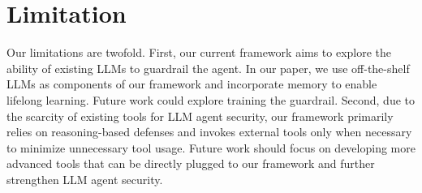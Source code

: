\section*{Limitation}



Our limitations are twofold. First, our current framework aims to explore the ability of existing LLMs to guardrail the agent. In our paper, we use off-the-shelf LLMs as components of our framework and incorporate memory to enable lifelong learning. Future work could explore training the guardrail. Second, due to the scarcity of existing tools for LLM agent security, our framework primarily relies on reasoning-based defenses and invokes external tools only when necessary to minimize unnecessary tool usage.
Future work should focus on developing more advanced tools that can be directly plugged to our framework and further strengthen LLM agent security. 













